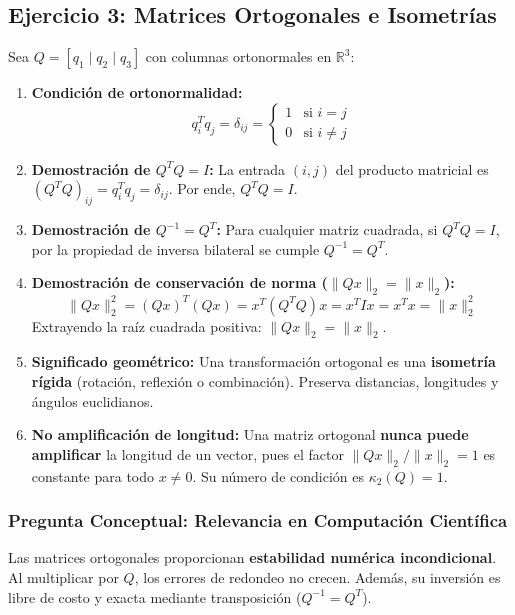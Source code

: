 \documentclass[11pt,a4paper]{article}
\theoremstyle{definition}
\theoremstyle{remark}
\begin{document}
\subsection{Ejercicio 3: Matrices Ortogonales e Isometrías}
Sea $Q = [q_1 \mid q_2 \mid q_3]$ con columnas ortonormales en $\mathbb{R}^3$:
\begin{enumerate}[leftmargin=*]
    \item \textbf{Condición de ortonormalidad:}
    \begin{equation}
        q_i^T q_j = \delta_{ij} = \begin{cases} 1 & \text{si } i = j \\ 0 & \text{si } i \neq j \end{cases}
    \end{equation}
    \item \textbf{Demostración de $Q^T Q = I$:}
    La entrada $(i, j)$ del producto matricial es $(Q^T Q)_{ij} = q_i^T q_j = \delta_{ij}$. Por ende, $Q^T Q = I$.
    \item \textbf{Demostración de $Q^{-1} = Q^T$:}
    Para cualquier matriz cuadrada, si $Q^T Q = I$, por la propiedad de inversa bilateral se cumple $Q^{-1} = Q^T$.
    \item \textbf{Demostración de conservación de norma ($\|Qx\|_2 = \|x\|_2$):}
    \begin{equation}
        \|Qx\|_2^2 = (Qx)^T (Qx) = x^T (Q^T Q) x = x^T I x = x^T x = \|x\|_2^2
    \end{equation}
    Extrayendo la raíz cuadrada positiva: $\|Qx\|_2 = \|x\|_2$.
    \item \textbf{Significado geométrico:} Una transformación ortogonal es una \textbf{isometría rígida} (rotación, reflexión o combinación). Preserva distancias, longitudes y ángulos euclidianos.
    \item \textbf{No amplificación de longitud:} Una matriz ortogonal \textbf{nunca puede amplificar} la longitud de un vector, pues el factor $\|Qx\|_2 / \|x\|_2 = 1$ es constante para todo $x \neq 0$. Su número de condición es $\kappa_2(Q) = 1$.
\end{enumerate}

\subsubsection{Pregunta Conceptual: Relevancia en Computación Científica}
Las matrices ortogonales proporcionan \textbf{estabilidad numérica incondicional}. Al multiplicar por $Q$, los errores de redondeo no crecen. Además, su inversión es libre de costo y exacta mediante transposición ($Q^{-1} = Q^T$).
\end{document}
